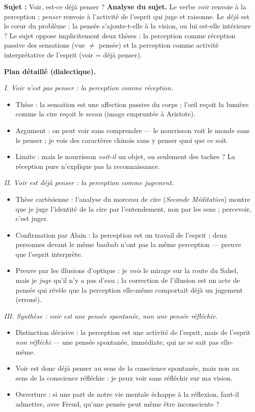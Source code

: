 \documentclass[11pt]{article}
\begin{document}
\begin{exoresolu}
\textbf{Sujet :} \guillemotleft Voir, est-ce déjà penser ? \guillemotright
\tcblower
\textbf{Analyse du sujet.} Le verbe \emph{voir} renvoie à la perception ; \emph{penser} renvoie à l'activité de l'esprit qui juge et raisonne. Le \emph{déjà} est le cœur du problème : la pensée s'ajoute-t-elle à la vision, ou lui est-elle intérieure ? Le sujet oppose implicitement deux thèses : la perception comme réception passive des sensations (vue $\neq$ pensée) et la perception comme activité interprétative de l'esprit (voir = déjà penser).

\textbf{Plan détaillé (dialectique).}

\emph{I. Voir n'est pas penser : la perception comme réception.}
\begin{itemize}
\item Thèse : la sensation est une affection passive du corps ; l'œil reçoit la lumière comme la cire reçoit le sceau (image empruntée à Aristote).
\item Argument : on peut voir sans comprendre — le nourrisson voit le monde sans le penser ; je vois des caractères chinois sans y penser quoi que ce soit.
\item Limite : mais le nourrisson \emph{voit-il} un objet, ou seulement des taches ? La réception pure n'explique pas la reconnaissance.
\end{itemize}

\emph{II. Voir est déjà penser : la perception comme jugement.}
\begin{itemize}
\item Thèse cartésienne : l'analyse du morceau de cire (\emph{Seconde Méditation}) montre que je juge l'identité de la cire par l'entendement, non par les sens ; percevoir, c'est juger.
\item Confirmation par Alain : la perception est un travail de l'esprit ; deux personnes devant le même baobab n'ont pas la même perception — preuve que l'esprit interprète.
\item Preuve par les illusions d'optique : je \emph{vois} le mirage sur la route du Sahel, mais je \emph{juge} qu'il n'y a pas d'eau ; la correction de l'illusion est un acte de pensée qui révèle que la perception elle-même comportait déjà un jugement (erroné).
\end{itemize}

\emph{III. Synthèse : voir est une pensée spontanée, non une pensée réfléchie.}
\begin{itemize}
\item Distinction décisive : la perception est une activité de l'esprit, mais de l'esprit \emph{non réfléchi} — une pensée spontanée, immédiate, qui ne se sait pas elle-même.
\item Voir est donc déjà penser au sens de la conscience spontanée, mais non au sens de la conscience réfléchie : je peux voir sans réfléchir sur ma vision.
\item Ouverture : si une part de notre vie mentale échappe à la réflexion, faut-il admettre, avec Freud, qu'une pensée peut même être inconsciente ?
\end{itemize}


\end{exoresolu}
\end{document}

